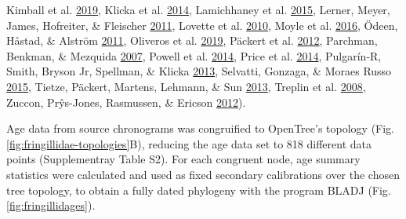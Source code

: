 \documentclass[english,man]{apa6}
\begin{document}
\begin{minipage}{18.2cm}
{Kimball et al. \protect\hyperlink{ref-kimball2019phylogenomic}{2019},
Klicka et al. \protect\hyperlink{ref-klicka2014comprehensive}{2014},
Lamichhaney et al. \protect\hyperlink{ref-lamichhaney2015evolution}{2015},
Lerner, Meyer, James, Hofreiter, \& Fleischer \protect\hyperlink{ref-lerner2011multilocus}{2011},
Lovette et al. \protect\hyperlink{ref-lovette2010comprehensive}{2010},
Moyle et al. \protect\hyperlink{ref-moyle2016tectonic}{2016},
Ödeen, Håstad, \& Alström \protect\hyperlink{ref-odeen2011evolution}{2011},
Oliveros et al. \protect\hyperlink{ref-oliveros2019earth}{2019},
Päckert et al. \protect\hyperlink{ref-packert2012horizontal}{2012},
Parchman, Benkman, \& Mezquida \protect\hyperlink{ref-parchman2007coevolution}{2007},
Powell et al. \protect\hyperlink{ref-powell2014comprehensive}{2014},
  Price et al. \protect\hyperlink{ref-price2014niche}{2014},
  Pulgarín-R, Smith, Bryson Jr, Spellman, \& Klicka \protect\hyperlink{ref-pulgarin2013multilocus}{2013},
  Selvatti, Gonzaga, \& Moraes Russo \protect\hyperlink{ref-selvatti2015paleogene}{2015},
  Tietze, Päckert, Martens, Lehmann, \& Sun \protect\hyperlink{ref-tietze2013complete}{2013},
  Treplin et al. \protect\hyperlink{ref-treplin2008molecular}{2008},
  Zuccon, Prŷs-Jones, Rasmussen, \& Ericson \protect\hyperlink{ref-zuccon2012phylogenetic}{2012}).}
\label{fig:fringillidae-topologies}
\end{minipage}

Age data from source chronograms was congruified to OpenTree's topology (Fig. \ref{fig:fringillidae-topologies}B), reducing the age data set to 818 different data points (Supplementray Table S2). For each congruent node, age summary statistics were calculated and used as fixed secondary calibrations over the chosen tree topology, to obtain a fully dated phylogeny with the program BLADJ (Fig. \ref{fig:fringillidages}).
\end{document}
